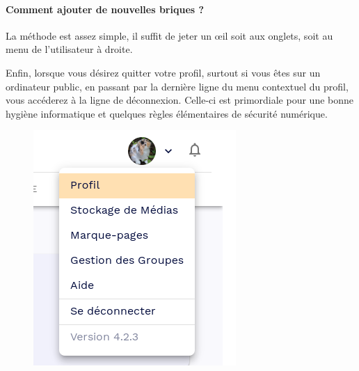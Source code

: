 \paragraph*{Comment ajouter de nouvelles briques ?}
La méthode est assez simple, il suffit de jeter un \oe{}il soit aux onglets, soit au menu de l'utilisateur à droite.













Enfin, lorsque vous désirez quitter votre profil, surtout si vous êtes sur un ordinateur public, en passant par la dernière ligne du menu contextuel du profil, vous accéderez à la ligne de déconnexion. 
Celle-ci est primordiale pour une bonne hygiène informatique et quelques règles élémentaires de sécurité numérique.
\begin{figure}
	\centering
	\includegraphics[width=0.3333\linewidth]{./Captures/menu.profil.png}
\end{figure}